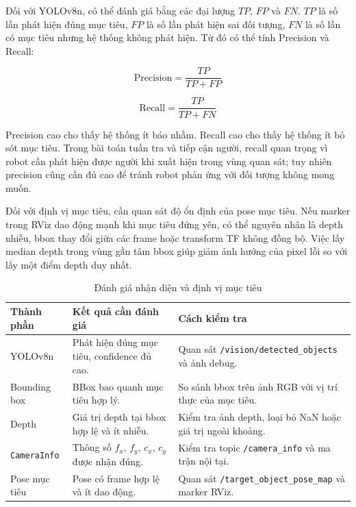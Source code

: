 Đối với YOLOv8n, có thể đánh giá bằng các đại lượng $TP$, $FP$ và $FN$. $TP$ là số lần phát hiện đúng mục tiêu, $FP$ là số lần phát hiện sai đối tượng, $FN$ là số lần có mục tiêu nhưng hệ thống không phát hiện. Từ đó có thể tính Precision và Recall:

\begin{equation}
    \mathrm{Precision}
    =
    \frac{TP}{TP+FP}
    \label{eq:precision}
\end{equation}

\begin{equation}
    \mathrm{Recall}
    =
    \frac{TP}{TP+FN}
    \label{eq:recall}
\end{equation}

Precision cao cho thấy hệ thống ít báo nhầm. Recall cao cho thấy hệ thống ít bỏ sót mục tiêu. Trong bài toán tuần tra và tiếp cận người, recall quan trọng vì robot cần phát hiện được người khi xuất hiện trong vùng quan sát; tuy nhiên precision cũng cần đủ cao để tránh robot phản ứng với đối tượng không mong muốn.

Đối với định vị mục tiêu, cần quan sát độ ổn định của pose mục tiêu. Nếu marker trong RViz dao động mạnh khi mục tiêu đứng yên, có thể nguyên nhân là depth nhiễu, bbox thay đổi giữa các frame hoặc transform TF không đồng bộ. Việc lấy median depth trong vùng gần tâm bbox giúp giảm ảnh hưởng của pixel lỗi so với lấy một điểm depth duy nhất.

\begin{table}[H]
    \centering
    \caption{Đánh giá nhận diện và định vị mục tiêu}
    \label{tab:detection-localization-evaluation}
    \renewcommand{\arraystretch}{1.25}
    \small
    \begin{tabularx}{\textwidth}{|>{\raggedright\arraybackslash}p{}|>{\raggedright\arraybackslash}p{}|>{\raggedright\arraybackslash}X|}
        \hline
        \textbf{Thành phần} & \textbf{Kết quả cần đánh giá} & \textbf{Cách kiểm tra} \\
        \hline
        YOLOv8n & Phát hiện đúng mục tiêu, confidence đủ cao. & Quan sát \texttt{/vision/detected\_objects} và ảnh debug. \\
        \hline
        Bounding box & BBox bao quanh mục tiêu hợp lý. & So sánh bbox trên ảnh RGB với vị trí thực của mục tiêu. \\
        \hline
        Depth & Giá trị depth tại bbox hợp lệ và ít nhiễu. & Kiểm tra ảnh depth, loại bỏ NaN hoặc giá trị ngoài khoảng. \\
        \hline
        \texttt{CameraInfo} & Thông số $f_x$, $f_y$, $c_x$, $c_y$ được nhận đúng. & Kiểm tra topic \texttt{/camera\_info} và ma trận nội tại. \\
        \hline
        Pose mục tiêu & Pose có frame hợp lệ và ít dao động. & Quan sát \texttt{/target\_object\_pose\_map} và marker RViz. \\
        \hline
    \end{tabularx}
\end{table}

